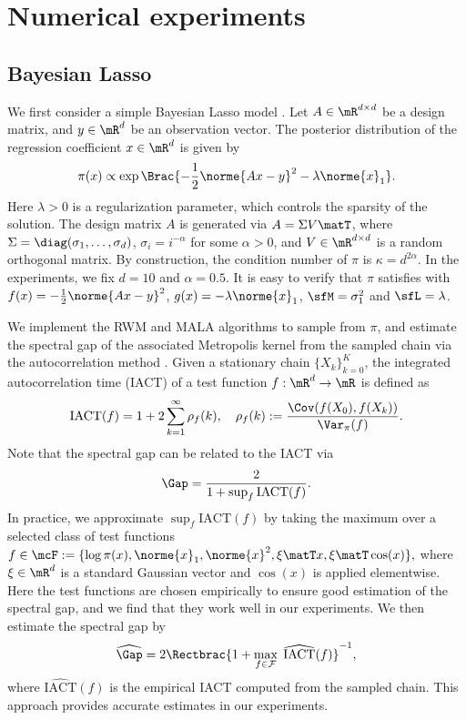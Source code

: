 \documentclass[11pt]{article}
\begin{document}
\section{Numerical experiments}
\label{sec:Numerics}


\subsection{Bayesian Lasso}
\label{sec:Num_BayeLasso}
%
We first consider a simple Bayesian Lasso model \citep{Park01062008}.
Let $A \in \mR^{d \times d}$ be a design matrix, and $y \in \mR^d$ be an observation vector.
The posterior distribution of the regression coefficient $x \in \mR^d$ is given by
\begin{equation}
\label{eqn:BayeLasso}
    \pi(x) \propto \exp \Brac{ - \frac{1}{2} \norme{Ax - y}^2 - \lambda \norme{x}_1 }.
\end{equation}
Here $\lambda>0$ is a regularization parameter, which controls the sparsity of the solution.
%
The design matrix $A$ is generated via $A = \Sigma V\matT$, where $\Sigma = \diag(\sigma_1, \dots, \sigma_d)$, $\sigma_i = i^{-\alpha}$ for some $\alpha > 0$, and $V \in \mR^{d \times d}$ is a random orthogonal matrix.
By construction, the condition number of $\pi$ is $\kappa = d^{2\alpha}$.
In the experiments, we fix $d=10$ and $\alpha=0.5$.
It is easy to verify that $\pi$ satisfies  with $f(x) = - \frac{1}{2} \norme{Ax - y}^2$, $g(x) = - \lambda \norme{x}_1$, $\sfM = \sigma_1^2$ and $\sfL = \lambda$.


We implement the RWM and MALA algorithms to sample from $\pi$, and estimate the spectral gap of the associated Metropolis kernel from the sampled chain via the autocorrelation method \citep{10.1214/ss/1177011137}.
Given a stationary chain $\{X_k\}_{k=0}^{K}$, the integrated autocorrelation time (IACT) of a test function $f:\mR^d \to \mR$ is defined as
\begin{equation}
    \mathrm{IACT} (f) = 1 + 2 \sum_{k=1}^\infty \rho_f(k), \quad \rho_f(k) := \frac{ \Cov( f(X_0), f(X_k) ) }{ \Var_\pi(f) }.
\end{equation}
Note that the spectral gap can be related to the IACT via \citep{10.1214/ss/1177011137}
\begin{equation}
    \Gap = \frac{2}{1+\sup_f \mathrm{IACT}(f)}.
\end{equation}
In practice, we approximate $\sup_f \mathrm{IACT}(f)$ by taking the maximum over a selected class of test functions
\(
    f \in \mcF := \{ \log \pi(x), \norme{x}_1, \norme{x}^2, \xi\matT x, \xi\matT \cos (x) \},
\)
where $\xi \in \mR^d$ is a standard Gaussian vector and $\cos (x)$ is applied elementwise.
Here the test functions are chosen empirically to ensure good estimation of the spectral gap, and we find that they work well in our experiments.
We then estimate the spectral gap by
\begin{equation}
    \widehat{\Gap} = 2 \Rectbrac{1+\max_{f\in\mathcal{F}} \; \widehat{\mathrm{IACT}}(f)}^{-1},
\end{equation}
where $\widehat{\mathrm{IACT}}(f)$ is the empirical IACT computed from the sampled chain.
This approach provides accurate estimates in our experiments.
\end{document}
